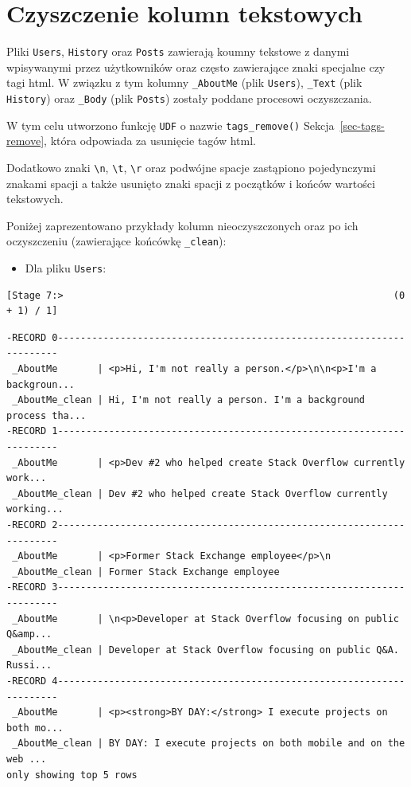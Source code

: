 \documentclass[
  letterpaper,
  DIV=11,
  numbers=noendperiod]{scrreprt}
\providecommand{\tightlist}{%
  \setlength{\itemsep}{0pt}\setlength{\parskip}{0pt}}\usepackage{longtable,booktabs,array}
\begin{document}
\normalsize

\hypertarget{czyszczenie-kolumn-tekstowych}{%
\section{Czyszczenie kolumn
tekstowych}\label{czyszczenie-kolumn-tekstowych}}

Pliki \texttt{Users}, \texttt{History} oraz \texttt{Posts} zawierają
koumny tekstowe z danymi wpisywanymi przez użytkowników oraz często
zawierające znaki specjalne czy tagi html. W związku z tym kolumny
\texttt{\_AboutMe} (plik \texttt{Users}), \texttt{\_Text} (plik
\texttt{History}) oraz \texttt{\_Body} (plik \texttt{Posts}) zostały
poddane procesowi oczyszczania.

W tym celu utworzono funkcję \texttt{UDF} o nazwie
\texttt{tags\_remove()} Sekcja~\ref{sec-tags-remove}, która odpowiada za
usunięcie tagów html.

\small

\normalsize

Dodatkowo znaki \texttt{\textbackslash{}n}, \texttt{\textbackslash{}t},
\texttt{\textbackslash{}r} oraz podwójne spacje zastąpiono pojedynczymi
znakami spacji a także usunięto znaki spacji z początków i końców
wartości tekstowych.

Poniżej zaprezentowano przykłady kolumn nieoczyszczonych oraz po ich
oczyszczeniu (zawierające końcówkę \texttt{\_clean}):

\begin{itemize}
\tightlist
\item
  Dla pliku \texttt{Users}: \small
\end{itemize}

\begin{verbatim}
[Stage 7:>                                                          (0 + 1) / 1]
\end{verbatim}

\begin{verbatim}
-RECORD 0----------------------------------------------------------------------
 _AboutMe       | <p>Hi, I'm not really a person.</p>\n\n<p>I'm a backgroun... 
 _AboutMe_clean | Hi, I'm not really a person. I'm a background process tha... 
-RECORD 1----------------------------------------------------------------------
 _AboutMe       | <p>Dev #2 who helped create Stack Overflow currently work... 
 _AboutMe_clean | Dev #2 who helped create Stack Overflow currently working... 
-RECORD 2----------------------------------------------------------------------
 _AboutMe       | <p>Former Stack Exchange employee</p>\n                      
 _AboutMe_clean | Former Stack Exchange employee                               
-RECORD 3----------------------------------------------------------------------
 _AboutMe       | \n<p>Developer at Stack Overflow focusing on public Q&amp... 
 _AboutMe_clean | Developer at Stack Overflow focusing on public Q&A. Russi... 
-RECORD 4----------------------------------------------------------------------
 _AboutMe       | <p><strong>BY DAY:</strong> I execute projects on both mo... 
 _AboutMe_clean | BY DAY: I execute projects on both mobile and on the web ... 
only showing top 5 rows
\end{verbatim}
\end{document}
